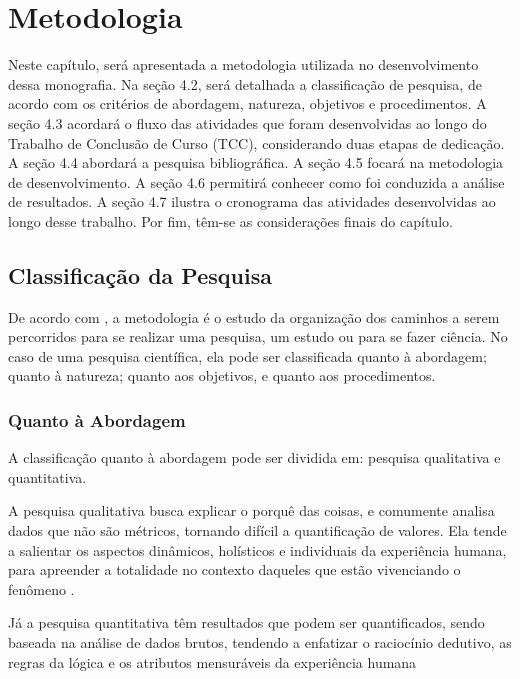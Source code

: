 \chapter[Metodologia]{Metodologia}
\label{ch:metodologia}

Neste capítulo, será apresentada a metodologia utilizada no desenvolvimento dessa 
monografia. Na seção 4.2, será detalhada a classificação de pesquisa, de acordo com os 
critérios de abordagem, natureza, objetivos e procedimentos. A seção 4.3 acordará o fluxo 
das atividades que foram desenvolvidas ao longo do Trabalho de Conclusão de Curso (TCC), considerando duas etapas de dedicação. 
A seção 4.4 abordará a pesquisa bibliográfica.
A seção 4.5 focará na metodologia de desenvolvimento. A seção 4.6 permitirá conhecer como foi conduzida 
a análise de resultados. A seção 4.7 ilustra o cronograma das atividades desenvolvidas ao 
longo desse trabalho. Por fim, têm-se as considerações finais do capítulo.


\section{Classificação da Pesquisa}

De acordo com , a metodologia é o estudo da organização dos 
caminhos a serem percorridos para se realizar uma pesquisa, um estudo ou para se 
fazer ciência. No caso de uma pesquisa científica, ela pode ser classificada quanto à 
abordagem; quanto à natureza; quanto aos objetivos, e quanto aos procedimentos.

\subsection{Quanto à Abordagem}

A classificação quanto à abordagem pode ser dividida em: pesquisa qualitativa e quantitativa. 

A pesquisa qualitativa busca explicar o porquê das coisas, e 
comumente analisa dados que não são métricos, tornando difícil 
a quantificação de valores. Ela tende a salientar os
aspectos dinâmicos, holísticos e individuais da experiência humana, para apreender
a totalidade no contexto daqueles que estão vivenciando o fenômeno \cite{gerhardt2009}.

Já a pesquisa quantitativa têm resultados que podem ser quantificados, sendo baseada na 
análise de dados brutos, tendendo a enfatizar o raciocínio dedutivo, as regras da lógica 
e os atributos mensuráveis da experiência humana

